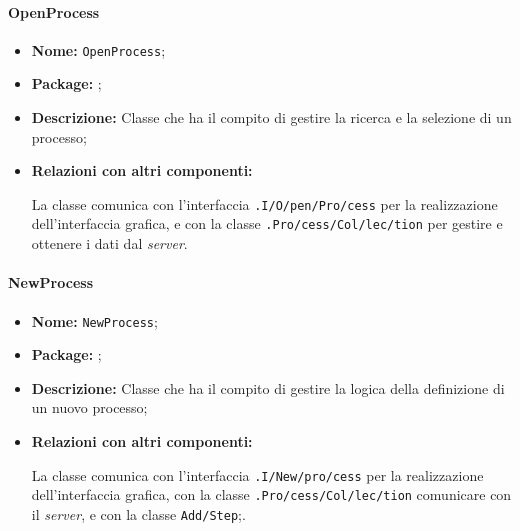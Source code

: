 \paragraph{OpenProcess}
\begin{flushleft}
\begin{itemize}
\item \textbf{Nome:} \texttt{OpenProcess};
\item \textbf{Package:} \texttt{\logicAdmin{}};
\item \textbf{Descrizione:} Classe che ha il compito di gestire la ricerca e la selezione di un processo;
\item \textbf{Relazioni con altri componenti:}
\begin{sloppypar}
La classe comunica con l'interfaccia \texttt{\viewAdmin{}.I\fshyp{}O\fshyp{}pen\fshyp{}Pro\fshyp{}cess} per la realizzazione dell'interfaccia grafica, e con la classe \texttt{\collection{}.Pro\fshyp{}cess\fshyp{}Col\fshyp{}lec\fshyp{}tion} per gestire e ottenere i dati dal \textit{server}.
\end{sloppypar}
\end{itemize}
\end{flushleft}

\paragraph{NewProcess}
\begin{flushleft}
\begin{itemize}
\item \textbf{Nome:} \texttt{NewProcess};
\item \textbf{Package:} \texttt{\logicAdmin{}};
\item \textbf{Descrizione:} Classe che ha il compito di gestire la logica della definizione di un nuovo processo;
\item \textbf{Relazioni con altri componenti:}
\begin{sloppypar}
La classe comunica con l'interfaccia \texttt{\viewAdmin{}.I\fshyp{}New\fshyp{}pro\fshyp{}cess} per la realizzazione dell'interfaccia grafica, con la classe \texttt{\collection{}.Pro\fshyp{}cess\fshyp{}Col\fshyp{}lec\fshyp{}tion} comunicare con il \textit{server}, e con la classe \texttt{\logicAdmin{}Add\fshyp{}Step};.
\end{sloppypar}
\end{itemize}
\end{flushleft}

